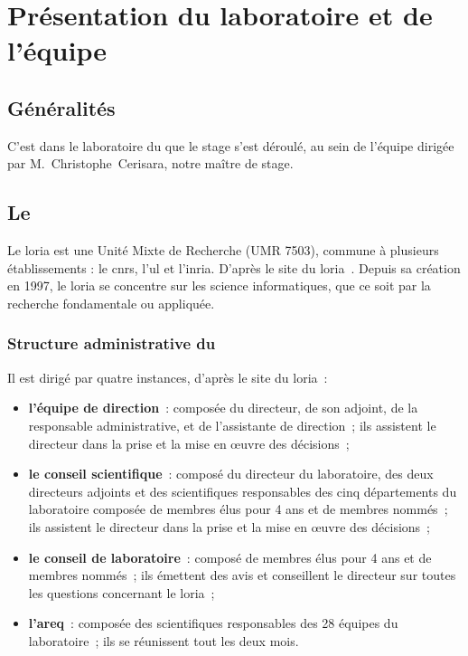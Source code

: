 \chapter{Présentation du laboratoire et de l'équipe}
\section{Généralités}
C'est dans le laboratoire du  que le stage s'est déroulé, au sein de l'équipe  dirigée par M.~Christophe~Cerisara, notre maître de stage.

\section{Le }
Le \gls{loria} \og est une Unité Mixte de Recherche (UMR 7503), commune à plusieurs établissements : le \gls{cnrs}, l’\gls{ul} et l'\gls{inria}. \fg{} D'après le site du \gls{loria}~\autocite{about_loria}.
Depuis sa création en 1997, le \gls{loria} se concentre sur les science informatiques, que ce soit par la recherche fondamentale ou appliquée.

\subsection{Structure administrative du }
Il est dirigé par quatre instances, d'après le site du \gls{loria}~\autocite{organisation_loria}:
\begin{itemize}
	\item \textbf{l'équipe de direction}~: composée du directeur, de son adjoint, de la responsable administrative, et de l'assistante de direction~; ils assistent le directeur dans la prise et la mise en œuvre des décisions~;
	\item \textbf{le conseil scientifique}~: composé du directeur du laboratoire, des deux directeurs adjoints et des scientifiques responsables des cinq départements du laboratoire composée de membres élus pour 4 ans et de membres nommés~; ils assistent le directeur dans la prise et la mise en œuvre des décisions~;
	\item \textbf{le conseil de laboratoire}~: composé de membres élus pour 4 ans et de membres nommés~; ils émettent des avis et conseillent le directeur sur toutes les questions concernant le \gls{loria}~;
	\item \textbf{l'\gls{areq}}~: composée des scientifiques responsables des 28 équipes du laboratoire~; ils se réunissent tout les deux mois.
\end{itemize}

